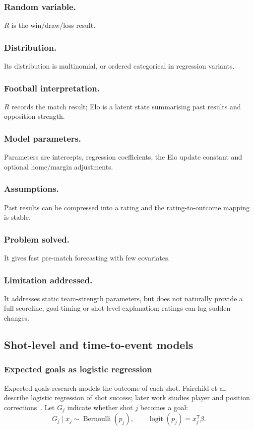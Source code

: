 \documentclass[11pt,a4paper]{amsart}
\numberwithin{equation}{section}
\begin{document}
\subsubsection*{Random variable.} $R$ is the win/draw/loss result.
\subsubsection*{Distribution.} Its distribution is multinomial, or ordered categorical in regression variants.
\subsubsection*{Football interpretation.} $R$ records the match result; Elo is a latent state summarising past results and opposition strength.
\subsubsection*{Model parameters.} Parameters are intercepts, regression coefficients, the Elo update constant and optional home/margin adjustments.
\subsubsection*{Assumptions.} Past results can be compressed into a rating and the rating-to-outcome mapping is stable.
\subsubsection*{Problem solved.} It gives fast pre-match forecasting with few covariates.
\subsubsection*{Limitation addressed.} It addresses static team-strength parameters, but does not naturally provide a full scoreline, goal timing or shot-level explanation; ratings can lag sudden changes.

\subsection{Shot-level and time-to-event models}

\subsubsection{Expected goals as logistic regression}
Expected-goals research models the outcome of each shot. Fairchild et al.~\cite{fairchild2018} describe logistic regression of shot success; later work studies player and position corrections~\cite{fairchild2023}. Let $G_j$ indicate whether shot $j$ becomes a goal:
\begin{equation}G_j\mid x_j\sim\operatorname{Bernoulli}(p_j),\qquad\operatorname{logit}(p_j)=x_j^{\mathsf T}\beta.
\end{equation}
\end{document}
